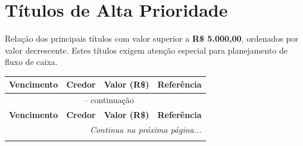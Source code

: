\documentclass[12pt, a4paper]{article}
\begin{document}
\newpage

\section{Títulos de Alta Prioridade}

Relação dos principais títulos com valor superior a \textbf{R\$ 5.000,00}, ordenados por valor decrescente. Estes títulos exigem atenção especial para planejamento de fluxo de caixa.

\begin{longtable}{c p{5.5cm} r p{3cm}}
    \toprule
    \rowcolor{tableHeader} \textbf{Vencimento} & \textbf{Credor} & \textbf{Valor (R\$)} & \textbf{Referência} \\
    \midrule
    \endfirsthead

    \multicolumn{4}{c}{{\tablename\ \thetable{} -- continuação}} \\
    \toprule
    \rowcolor{tableHeader} \textbf{Vencimento} & \textbf{Credor} & \textbf{Valor (R\$)} & \textbf{Referência} \\
    \midrule
    \endhead

    \midrule
    \multicolumn{4}{r}{\textit{Continua na próxima página...}} \\
    \endfoot

    \bottomrule
    \endlastfoot


\end{longtable}
\end{document}
